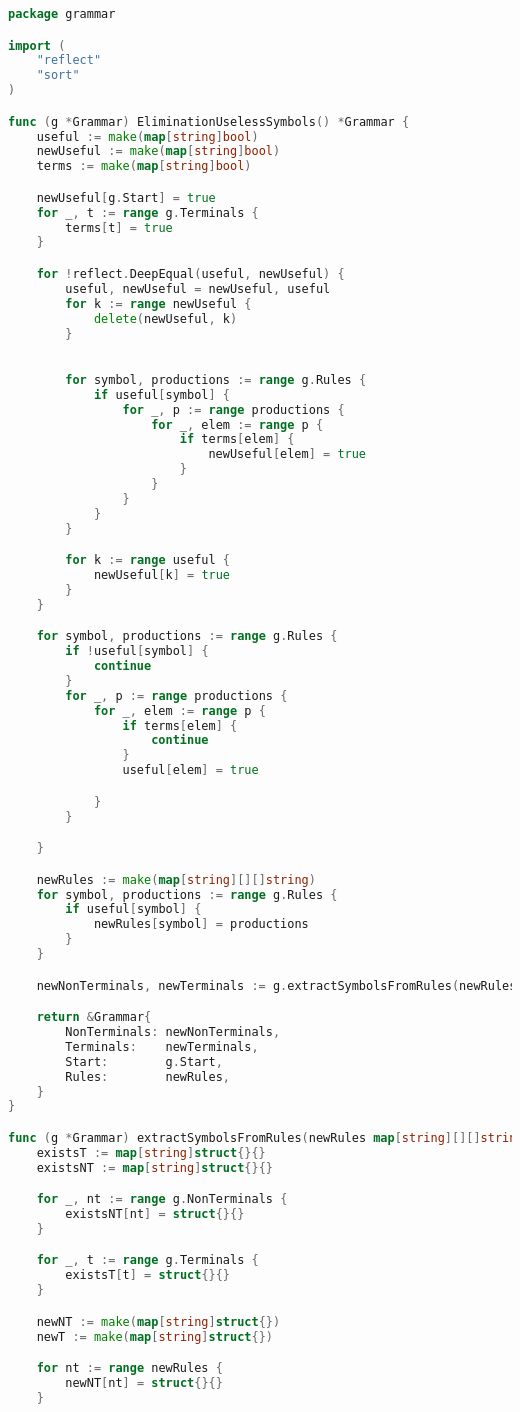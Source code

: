 \begin{lstlisting}[language=Go, caption={Код модуля \textit{grammar} --- устранение бесполезных символов}]
package grammar

import (
	"reflect"
	"sort"
)

func (g *Grammar) EliminationUselessSymbols() *Grammar {
	useful := make(map[string]bool)
	newUseful := make(map[string]bool)
	terms := make(map[string]bool)

	newUseful[g.Start] = true
	for _, t := range g.Terminals {
		terms[t] = true
	}

	for !reflect.DeepEqual(useful, newUseful) {
		useful, newUseful = newUseful, useful
		for k := range newUseful {
			delete(newUseful, k)
		}

		
		for symbol, productions := range g.Rules {
			if useful[symbol] {
				for _, p := range productions {
					for _, elem := range p {
						if terms[elem] {
							newUseful[elem] = true
						}
					}
				}
			}
		}

		for k := range useful {
			newUseful[k] = true
		}
	}

	for symbol, productions := range g.Rules {
		if !useful[symbol] {
			continue
		}
		for _, p := range productions {
			for _, elem := range p {
				if terms[elem] {
					continue
				}
				useful[elem] = true

			}
		}

	}

	newRules := make(map[string][][]string)
	for symbol, productions := range g.Rules {
		if useful[symbol] { 
			newRules[symbol] = productions
		}
	}

	newNonTerminals, newTerminals := g.extractSymbolsFromRules(newRules)

	return &Grammar{
		NonTerminals: newNonTerminals,
		Terminals:    newTerminals,
		Start:        g.Start,
		Rules:        newRules,
	}
}

func (g *Grammar) extractSymbolsFromRules(newRules map[string][][]string) (nonTerminals, terminals []string) {
	existsT := map[string]struct{}{}
	existsNT := map[string]struct{}{}

	for _, nt := range g.NonTerminals {
		existsNT[nt] = struct{}{}
	}

	for _, t := range g.Terminals {
		existsT[t] = struct{}{}
	}

	newNT := make(map[string]struct{})
	newT := make(map[string]struct{})

	for nt := range newRules {
		newNT[nt] = struct{}{}
	}


\end{lstlisting}
